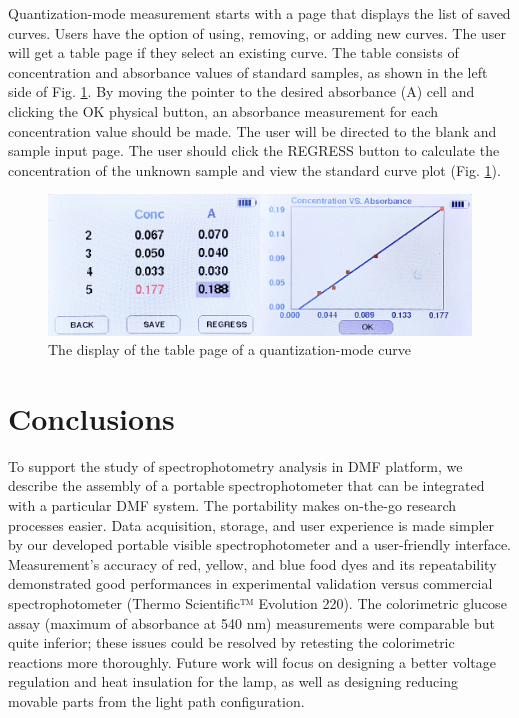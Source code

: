 \documentclass[conference]{IEEEtran}
\begin{document}
Quantization-mode measurement starts with a page that displays the list of saved curves.
Users have the option of using, removing, or adding new curves.
The user will get a table page if they select an existing curve.
The table consists of concentration and absorbance values of standard samples, as shown in the left side of Fig. \ref{lcd-conc}.
By moving the pointer to the desired absorbance (A) cell and clicking the OK physical button, an absorbance measurement for each concentration value should be made.
The user will be directed to the blank and sample input page.
The user should click the REGRESS button to calculate the concentration of the unknown sample and view the standard curve plot (Fig. \ref{lcd-conc}).

    \begin{figure}[htbp]
    \centerline{\includegraphics[scale=0.06]{lcd-conc.jpeg}}
    \caption{The display of the table page of a quantization-mode curve}
    \label{lcd-conc}
    \end{figure}

\section{Conclusions}
To support the study of spectrophotometry analysis in DMF platform, we describe the assembly of a portable spectrophotometer that can be integrated with a particular DMF system.
The portability makes on-the-go research processes easier.
Data acquisition, storage, and user experience is made simpler by our developed portable visible spectrophotometer and a user-friendly interface.
Measurement's accuracy of red, yellow, and blue food dyes and its repeatability demonstrated good performances in experimental validation versus commercial spectrophotometer (Thermo Scientific™ Evolution 220).
The colorimetric glucose assay (maximum of absorbance at 540 nm) measurements were comparable but quite inferior; these issues could be resolved by retesting the colorimetric reactions more thoroughly.
Future work will focus on designing a better voltage regulation and heat insulation for the lamp, as well as designing reducing movable parts from the light path configuration.
\end{document}
